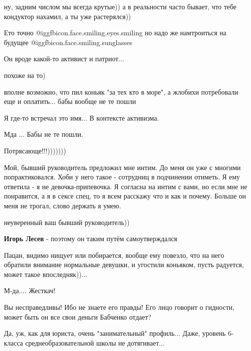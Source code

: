 \begin{itemize}
\begin{itemize} %
ну, задним числом мы всегда крутые)) а в реальности часто бывает, что тебе кондуктор нахамил, а ты уже растерялся))

Ето точно @igg{fbicon.face.smiling.eyes.smiling}  но надо же намтроиться на будущее @igg{fbicon.face.smiling.sunglasses} 

\end{itemize} %

Он вроде какой-то активист и патриот...

\begin{itemize} %
похоже на то)

вполне возможно, что пил коньяк "за тех кто в море", а жлобихи потребовали еще и оплатить... бабы вообще не те пошли

Я где-то встречал это имя... В контексте активизма.
\end{itemize} %

Мда ... Бабы не те пошли.

Потрясающе!!!)))))))


Мой, бывший руководитель предложил мне интим. До меня он уже с многими
попрактиковался. Хоби у него такое - сотрудниц в подчинении отиметь. Я ему
ответила - я не девочка-припевочка. Я согласна на интим с вами, но если мне не
понравится, а я в сексе спец, то я всем расскажу что и как и почему. Больше он
меня не трогал, слово держать я умею.

\begin{itemize} %
неуверенный ваш бывший руководитель))

\textbf{Игорь Лесев} - поэтому он таким путём самоутверждался
\end{itemize} %


Пацан, видимо нищует или побирается, вообще ему повезло, что на него обратили
внимание нормальные девушки, и угостили коньяком, пусть радуется, может такое
впоследняк))...

М-да....
Жесткач!

Вы несправедливы! Ибо не знаете его правды! Его лицо говорит о гидности, может быть он все свои деньги Бабченко отдает?

Да, уж, как для юриста, очень "занимательный" профиль... Даже, уровень 6-класса среднеобразовательной школы не дотягивает...
\end{itemize} %
